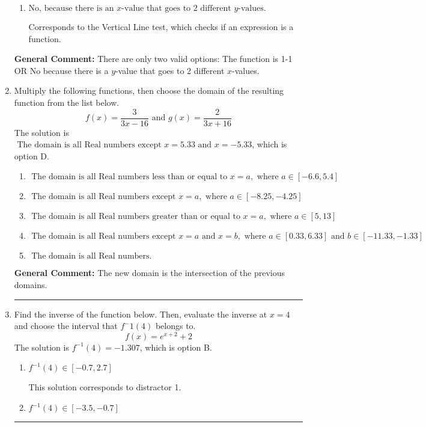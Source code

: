 \documentclass{extbook}[14pt]
\newcommand{\litem}[1]{\item #1

\rule{\textwidth}{0.4pt}}
\begin{document}
\begin{enumerate}
{\begin{enumerate}[label=\Alph*.]
Corresponds to believing 1-1 means the range is all Real numbers.
\item \( \text{No, because there is an $x$-value that goes to 2 different $y$-values.} \)

Corresponds to the Vertical Line test, which checks if an expression is a function.
\end{enumerate}

\textbf{General Comment:} There are only two valid options: The function is 1-1 OR No because there is a $y$-value that goes to 2 different $x$-values.
}
\litem{
Multiply the following functions, then choose the domain of the resulting function from the list below.
\[ f(x) = \frac{3}{3x-16} \text{ and } g(x) = \frac{2}{3x+16} \]The solution is \( \text{ The domain is all Real numbers except } x = 5.33 \text{ and } x = -5.33 \), which is option D.\begin{enumerate}[label=\Alph*.]
\item \( \text{ The domain is all Real numbers less than or equal to } x = a, \text{ where } a \in [-6.6, 5.4] \)


\item \( \text{ The domain is all Real numbers except } x = a, \text{ where } a \in [-8.25, -4.25] \)


\item \( \text{ The domain is all Real numbers greater than or equal to } x = a, \text{ where } a \in [5, 13] \)


\item \( \text{ The domain is all Real numbers except } x = a \text{ and } x = b, \text{ where } a \in [0.33, 6.33] \text{ and } b \in [-11.33, -1.33] \)


\item \( \text{ The domain is all Real numbers. } \)


\end{enumerate}

\textbf{General Comment:} The new domain is the intersection of the previous domains.
}
\litem{
Find the inverse of the function below. Then, evaluate the inverse at $x = 4$ and choose the interval that $f^-1(4)$ belongs to.
\[ f(x) = e^{x+2}+2 \]The solution is \( f^{-1}(4) = -1.307 \), which is option B.\begin{enumerate}[label=\Alph*.]
\item \( f^{-1}(4) \in [-0.7, 2.7] \)

 This solution corresponds to distractor 1.
\item \( f^{-1}(4) \in [-3.5, -0.7] \)


\end{enumerate}}
\end{enumerate}
\end{document}
